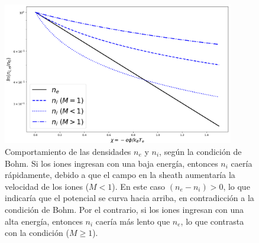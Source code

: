 \documentclass[../main.tex]{subfiles}
\begin{document}
    \begin{figure}[h]
        \centering
        \includegraphics[width=0.9\textwidth]{Images/bohm_dens(1).png}
        \caption{Comportamiento de las densidades $n_e$ y $n_i$, según la condición de Bohm. Si los iones ingresan con una baja energía, entonces $n_i$ caería rápidamente, debido a que el campo en la sheath aumentaría la velocidad de los iones ($M<1$). En este caso $(n_e - n_i) >0$, lo que indicaría que el potencial se curva hacia arriba, en contradicción a la condición de Bohm. Por el contrario, si los iones ingresan con una alta energía, entonces $n_i$ caería más lento que $n_e$, lo que contrasta con la condición ($M\geq1$).}
        \label{fig:grafica_M}
        \end{figure}
        
\end{document}
